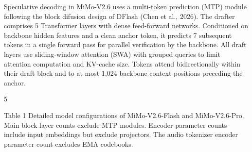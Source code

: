 \documentclass[
  10
]{article}
\begin{document}
Speculative decoding in MiMo-V2.6 uses a multi-token prediction (MTP)
module following the block difusion design of DFlash (Chen et al.,
2026). The drafter comprises 5 Transformer layers with dense
feed-forward networks. Conditioned on backbone hidden features and a
clean anchor token, it predicts 7 subsequent tokens in a single forward
pass for parallel verification by the backbone. All draft layers use
sliding-window attention (SWA) with grouped queries to limit attention
computation and KV-cache size. Tokens attend bidirectionally within
their draft block and to at most 1,024 backbone context positions
preceding the anchor.

5

Table 1 Detailed model configurations of MiMo-V2.6-Flash and
MiMo-V2.6-Pro. Main block layer counts exclude MTP modules. Encoder
parameter counts include input embeddings but exclude projectors. The
audio tokenizer encoder parameter count excludes EMA codebooks.
\end{document}
